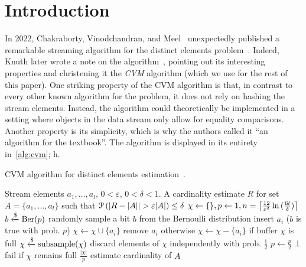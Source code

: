 \section{Introduction}
\label{sec:intro}

In 2022, Chakraborty, Vinodchandran, and Meel~\cite{chakraborty2022} unexpectedly published a remarkable streaming algorithm for the distinct elements problem~\cite{quanta}.
Indeed, Knuth later wrote a note on the algorithm~\cite{knuthnote}, pointing out its interesting properties and christening it the \emph{CVM} algorithm (which we use for the rest of this paper).
One striking property of the CVM algorithm is that, in contrast to every other known algorithm for the problem, it does not rely on hashing the stream elements.
Instead, the algorithm could theoretically be implemented in a setting where objects in the data stream only allow for equality comparisons.
Another property is its simplicity, which is why the authors called it ``an algorithm for the textbook''.
The algorithm is displayed in its entirety in~\cref{alg:cvm}; h.

\begin{algorithm}[h!]
	\caption{CVM algorithm for distinct elements estimation~\cite{chakraborty2022}.}\label{alg:cvm}
	\begin{algorithmic}[1]
  \Require Stream elements $a_1,\dots,a_l$, $0 < \varepsilon$, $0 < \delta < 1$.
  \Ensure A cardinality estimate $R$ for set $A = \{ a_1,\dots,a_l \}$ such that $\prob \left( |R - |A| | > \varepsilon |A| \right) \leq \delta$
  \State $\chi \gets \{\}, p \gets 1, n = \ceil*{\frac{12}{\varepsilon^2} \ln{(\frac{6l}{\delta})} }$
    \State $b \getsr \Ber(p)$ \Comment randomly sample a bit $b$ from the Bernoulli distribution
     \Comment insert $a_i$ ($b$ is true with prob. $p$)
      \State $\chi \gets \chi \cup \{a_i\}$
    \Else \Comment remove $a_i$ otherwise
      \State $\chi \gets \chi - \{a_i\}$
    \EndIf
     \Comment if buffer $\chi$ is full
      \State $\chi \getsr \mathrm{subsample}(\chi)$ \Comment discard elements of $\chi$ independently with prob. $\frac{1}{2}$
      \State $p \gets \frac{p}{2}$
    \EndIf
      \Return $\bot$ \Comment fail if $\chi$ remains full
    \EndIf
  \EndFor
  \State \Return $\frac{|\chi|}{p}$ \Comment estimate cardinality of $A$
  \end{algorithmic}
\end{algorithm}

